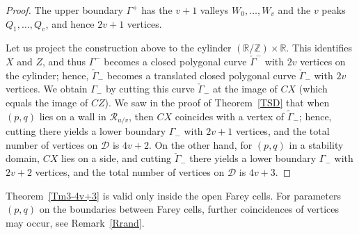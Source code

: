\documentclass[11pt,reqno,tbtags,a4paper]{amsart}
\numberwithin{equation}{section}
\theoremstyle{plain}%
\theoremstyle{definition}
\theoremstyle{remark}
\newcommand{\refT}[1]{Theorem~\ref{#1}}
\newcommand{\refR}[1]{Remark~\ref{#1}}
\newcommand\bbR{\mathbb R}
\newcommand\bbZ{\mathbb Z}
\newcounter{cc}
\newcommand\gG{\Gamma}
\newcommand\cD{\mathcal D}
\newcommand\cR{{\mathcal R}}
\newcommand\tgG{\widetilde{\gG}}
\newcommand\chgG{\check{\gG}}
\newcommand\0{{\boldsymbol 0}}
\newcommand\1{{\boldsymbol 1}}
\begin{document}
\begin{proof}
The upper boundary $\gG^+$ has the $v+1$ valleys
$W_0,\dots,W_v$ and the $v$ peaks $Q_1,\dots,Q_v$, and hence $2v+1$
vertices.  

Let us project the construction above to the cylinder $(\bbR/\bbZ)\times\bbR$.
This identifies $X$ and $Z$, and thus $\gG^-$ becomes a closed
polygonal curve $\chgG^-$ with $2v$ vertices on the cylinder;
hence, $\tgG_-$ becomes a translated closed polygonal curve $\chgG_-$ with
$2v$ vertices.
We obtain $\gG_-$ by cutting this curve $\chgG_-$ at the image of $CX$
(which equals the image of $CZ$).
We saw in the proof of \refT{TSD} that when $(p,q)$ lies 
on a wall in $\cR_{u/v}$, then 
$CX$ coincides with a vertex of $\tgG_-$; hence, cutting there yields
a lower boundary $\gG_-$ with $2v+1$ vertices,
and the total number of vertices on $\cD$ is $4v+2$.
On the other hand, for $(p,q)$ in a stability
domain, $CX$ lies on a side, and cutting $\chgG_-$ there yields
a lower boundary $\gG_-$ with $2v+2$ vertices,
and the total number of vertices on $\cD$ is $4v+3$.
\end{proof}

\refT{Tm3-4v+3} is valid only inside the open Farey cells. For parameters
$(p,q)$ on the boundaries between Farey cells, further coincidences of
vertices may occur, see \refR{Rrand}. 
\end{document}
